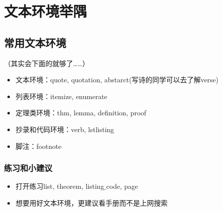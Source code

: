 \section{文本环境举隅}

\subsection{常用文本环境}

    \begin{frame}
    （其实会下面的就够了……）
    \begin{itemize}
        \item 文本环境：quote, quotation, abstarct(写诗的同学可以去了解verse)
        \item 列表环境：itemize, enumerate
        \item 定理类环境：thm, lemma, definition, proof
        \item 抄录和代码环境：verb, lstlisting
        \item 脚注：footnote
    \end{itemize}
    \end{frame}
    
    \begin{frame}
    \frametitle{练习和小建议}
    \begin{itemize}
    \item 打开练习list, theorem, listing$\_$code, page
    \item 想要用好文本环境，更建议看手册而不是上网搜索
    \end{itemize}
    \end{frame}